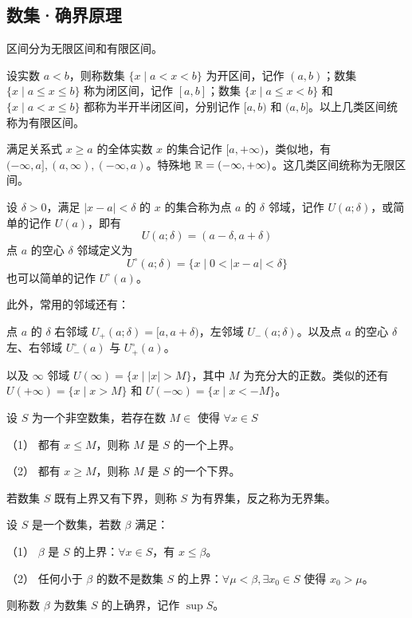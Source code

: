 \subsection{数集·确界原理}

区间分为无限区间和有限区间。

设实数 $a<b$，则称数集 $\{x \mid a<x<b\}$ 为开区间，记作 $(a,b)$；数集 $\{x \mid a\leqslant x \leqslant b\}$ 称为闭区间，记作 $[a,b]$；数集 $\{x \mid a\leqslant x<b\}$ 和 $\{x \mid a < x \leqslant b\}$ 都称为半开半闭区间，分别记作 $[a,b)$ 和 $(a,b]$。以上几类区间统称为有限区间。

满足关系式 $x\geqslant a$ 的全体实数 $x$ 的集合记作 $[a,+\infty)$，类似地，有 $(-\infty,a],(a,\infty),(-\infty,a)$。特殊地 $\mathbb{R} = (-\infty,+\infty)$。这几类区间统称为无限区间。

设 $\delta > 0$，满足 $|x-a|<\delta$ 的 $x$ 的集合称为点 $a$ 的 $\delta$ 邻域，记作 $U(a;\delta)$，或简单的记作 $U(a)$，即有
$$U(a;\delta) = (a-\delta,a+\delta)$$
点 $a$ 的空心 $\delta$ 邻域定义为
$$U^\circ (a;\delta) = \{x \mid 0<|x-a|<\delta\}$$
也可以简单的记作 $U^\circ(a)$。

此外，常用的邻域还有：

点 $a$ 的 $\delta$ 右邻域 $U_+(a;\delta) = [a,a+\delta)$，左邻域 $U_-(a;\delta)$。以及点 $a$ 的空心 $\delta$ 左、右邻域 $U_{-}^\circ(a)$ 与 $U_{+}^{\circ}(a)$。

以及 $\infty$ 邻域 $U(\infty) = \{x \mid |x|>M\}$，其中 $M$ 为充分大的正数。类似的还有 $U(+\infty) = \{x \mid x>M\}$ 和 $U(-\infty) = \{x \mid x<-M\}$。

\begin{definition}[有界集]
	设 $S$ 为一个非空数集，若存在数 $M\in$ 使得 $\forall x\in S$
	
	（1） 都有 $x\leqslant M$，则称 $M$ 是 $S$ 的一个上界。
	
	（2） 都有 $x\geqslant M$，则称 $M$ 是 $S$ 的一个下界。
\end{definition}

若数集 $S$ 既有上界又有下界，则称 $S$ 为有界集，反之称为无界集。

\begin{definition}[上确界]
	设 $S$ 是一个数集，若数 $\beta$ 满足：
	
	（1） $\beta$ 是 $S$ 的上界：$\forall x\in S$，有 $x\leqslant \beta$。
	
	（2） 任何小于 $\beta$ 的数不是数集 $S$ 的上界：$\forall \mu<\beta, \exists x_0\in S$ 使得 $x_0>\mu$。
	
	则称数 $\beta$ 为数集 $S$ 的上确界，记作 $\sup S$。
\end{definition}

